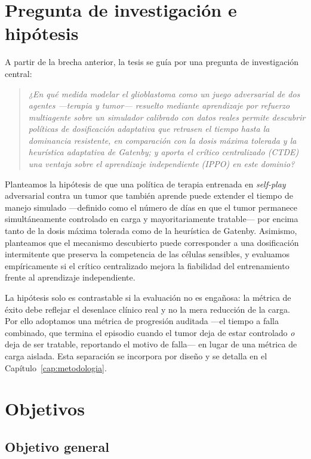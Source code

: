 \section{Pregunta de investigación e hipótesis}
\label{sec:pregunta}

A partir de la brecha anterior, la tesis se guía por una pregunta de investigación central:

\begin{quote}
\emph{¿En qué medida modelar el glioblastoma como un juego adversarial de dos agentes ---terapia y tumor--- resuelto mediante aprendizaje por refuerzo multiagente sobre un simulador calibrado con datos reales permite descubrir políticas de dosificación adaptativa que retrasen el tiempo hasta la dominancia resistente, en comparación con la dosis máxima tolerada y la heurística adaptativa de Gatenby; y aporta el crítico centralizado (CTDE) una ventaja sobre el aprendizaje independiente (IPPO) en este dominio?}
\end{quote}

Planteamos la hipótesis de que una política de terapia entrenada en \emph{self-play} adversarial contra un tumor que también aprende puede extender el tiempo de manejo simulado ---definido como el número de días en que el tumor permanece simultáneamente controlado en carga y mayoritariamente tratable--- por encima tanto de la dosis máxima tolerada como de la heurística de Gatenby. Asimismo, planteamos que el mecanismo descubierto puede corresponder a una dosificación intermitente que preserva la competencia de las células sensibles, y evaluamos empíricamente si el crítico centralizado mejora la fiabilidad del entrenamiento frente al aprendizaje independiente.

La hipótesis solo es contrastable si la evaluación no es engañosa: la métrica de éxito debe reflejar el desenlace clínico real y no la mera reducción de la carga. Por ello adoptamos una métrica de progresión auditada ---el tiempo a falla combinado, que termina el episodio cuando el tumor deja de estar controlado \emph{o} deja de ser tratable, reportando el motivo de falla--- en lugar de una métrica de carga aislada. Esta separación se incorpora por diseño y se detalla en el Capítulo~\ref{cap:metodologia}.

\section{Objetivos}
\label{sec:objetivos}

\subsection{Objetivo general}
\label{subsec:objetivo-general}

